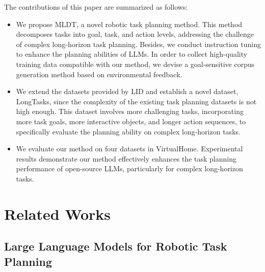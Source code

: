 The contributions of this paper are summarized as follows:

\begin{itemize}

\item We propose MLDT, a novel robotic task planning method. This method decomposes tasks into goal, task, and action levels, addressing the challenge of complex long-horizon task planning. Besides, we conduct instruction tuning to enhance the planning abilities of LLMs. In order to collect high-quality training data compatible with our method, we devise a goal-sensitive corpus generation method based on environmental feedback.

\item We extend the datasets provided by LID and establish a novel dataset, LongTasks, since the complexity of the existing task planning datasets is not high enough. This dataset involves more challenging tasks, incorporating more task goals, more interactive objects, and longer action sequences, to specifically evaluate the planning ability on complex long-horizon tasks.

\item We evaluate our method on four datasets in VirtualHome. Experimental results demonstrate our method effectively enhances the task planning performance of open-source LLMs, particularly for complex long-horizon tasks. 

\end{itemize}

\section{Related Works}

\subsection{Large Language Models for Robotic Task Planning}

